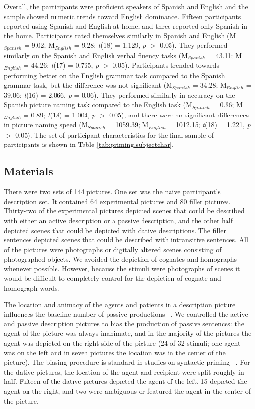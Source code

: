 Overall, the participants were proficient speakers of Spanish and English and the sample showed numeric trends toward English dominance. Fifteen participants reported using Spanish and English at home, and three reported only Spanish in the home. Participants rated themselves similarly in Spanish and English (M$_{Spanish}$ = 9.02; M$_{English}$ = 9.28; \emph{t}(18) = 1.129, \emph{p} $>$ 0.05). They performed similarly on the Spanish and English verbal fluency tasks (M$_{Spanish}$ = 43.11; M$_{English}$ = 44.26; \emph{t}(17) = 0.765, \emph{p} $>$ 0.05). Participants trended towards performing better on the English grammar task compared to the Spanish grammar task, but the difference was not significant (M$_{Spanish}$ = 34.28; M$_{English}$ = 39.06; \emph{t}(16) = 2.066, \emph{p} = 0.06). They performed similarly in accuracy on the Spanish picture naming task compared to the English task (M$_{Spanish}$ = 0.86; M$_{English}$ = 0.89; \emph{t}(18) = 1.004, \emph{p} $>$ 0.05), and there were no significant differences in picture naming speed (M$_{Spanish}$ = 1059.39; M$_{English}$ = 1012.15; \emph{t}(18) = 1.221, \emph{p} $>$ 0.05). The set of participant characteristics for the final sample of participants is shown in Table \ref{tab:priming.subjectchar}.

\subsection{Materials}
\label{materials}

There were two sets of 144 pictures. One set was the naive participant's description set. It contained 64 experimental pictures and 80 filler pictures. Thirty-two of the experimental pictures depicted scenes that could be described with either an active description or a passive description, and the other half depicted scenes that could be depicted with dative descriptions. The filler sentences depicted scenes that could be described with intransitive sentences. All of the pictures were photographs or digitally altered scenes consisting of photographed objects. We avoided the depiction of cognates and homographs whenever possible. However, because the stimuli were photographs of scenes it would be difficult to completely control for the depiction of cognate and homograph words. 

The location and animacy of the agents and patients in a description picture influences the baseline number of passive productions ~\citep[e.g.,][]{Bock1986, Hartsuiker1998}. We controlled the active and passive description pictures to bias the production of passive sentences: the agent of the picture was always inanimate, and in the majority of the pictures the agent was depicted on the right side of the picture (24 of 32 stimuli; one agent was on the left and in seven pictures the location was in the center of the picture). The biasing procedure is standard in studies on syntactic priming ~\citep[e.g.,][]{Hartsuiker2004}. For the dative pictures, the location of the agent and recipient were split roughly in half. Fifteen of the dative pictures depicted the agent of the left, 15 depicted the agent on the right, and two were ambiguous or featured the agent in the center of the picture. 

